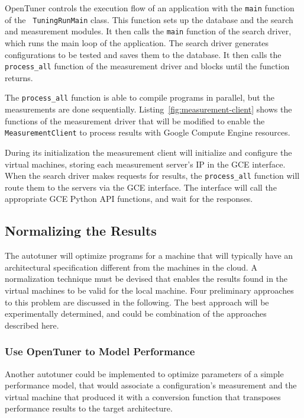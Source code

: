 \documentclass[a4paper, 12pt]{article}
\begin{document}
OpenTuner controls the execution flow of an application with the
\texttt{\footnotesize main} function of the \texttt{\footnotesize
TuningRunMain} class. This function sets up the database and the search and
measurement modules. It then calls the \texttt{\footnotesize main}
function of the search driver, which runs the main loop of the application.
The search driver generates configurations to be tested and saves
them to the database. It then calls the \texttt{\footnotesize process\_all}
function of the measurement driver and blocks until the function returns.



The \texttt{\footnotesize process\_all} function is able to compile programs in
parallel, but the measurements are done sequentially.
Listing~\ref{fig:measurement-client} shows the functions of the measurement
driver that will be modified to enable the \texttt{\footnotesize
MeasurementClient} to process results with Google Compute Engine resources.

During its initialization the measurement client will initialize and configure
the virtual machines, storing each measurement server's IP in the GCE
interface.  When the search driver makes requests for results, the
\texttt{\footnotesize process\_all} function will route them to the
servers via the GCE interface.  The interface will call the appropriate GCE
Python API functions, and wait for the responses.

\subsection{Normalizing the Results}

The autotuner will optimize programs for a machine that will typically have an
architectural specification different from the machines in the cloud. A
normalization technique must be devised that enables the results found in the
virtual machines to be valid for the local machine.  Four preliminary
approaches to this problem are discussed in the following. The best approach
will be experimentally determined, and could be combination of the approaches
described here.

\subsubsection{Use OpenTuner to Model Performance}

Another autotuner could be implemented to optimize parameters of a simple
performance model, that would associate a configuration's measurement and the
virtual machine that produced it with a conversion function that transposes
performance results to the target architecture.
\end{document}
